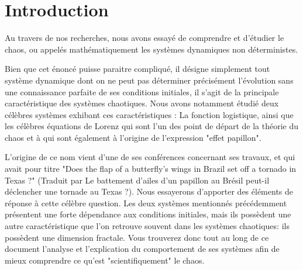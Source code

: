 \chapter{Introduction}
Au travers de nos recherches, nous avons essayé de comprendre et d'étudier le chaos, ou appelés mathématiquement les systèmes dynamiques non déterministes. 

Bien que cet énoncé puisse paraitre compliqué, il désigne simplement tout système dynamique dont on ne peut pas déterminer précisément l'évolution sans une connaissance parfaite de ses conditions initiales, il s'agit de la principale caractéristique des systèmes chaotiques. Nous avons notamment étudié deux célèbres systèmes exhibant ces caractéristiques : La fonction logistique, ainsi que les célèbres équations de Lorenz qui sont l'un des \og point de départ \fg{} de la théorie du chaos et à qui sont également à l'origine de l'expression "effet papillon".

L'origine de ce nom vient d'une de ses conférences concernant ses travaux, et qui avait pour titre "Does the flap of a butterfly’s wings in Brazil set off a tornado in Texas ?" (Traduit par \og Le battement d'ailes d'un papillon au Brésil peut-il déclencher une tornade au Texas ?\fg{}). Nous essayerons d’apporter des éléments de réponse à cette célèbre question. Les deux systèmes mentionnés précédemment présentent une forte dépendance aux conditions initiales, mais ils possèdent une autre caractéristique que l'on retrouve souvent dans les systèmes chaotiques: ils possèdent une dimension fractale. Vous trouverez donc tout au long de ce document l'analyse et l'explication du comportement de ses systèmes afin de mieux comprendre ce qu'est "scientifiquement" le chaos.
  
